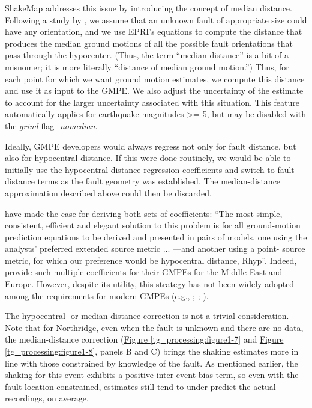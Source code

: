 \documentclass[letterpaper,10pt,english]{sphinxmanual}
\begin{document}
ShakeMap addresses this issue by introducing the concept of median distance. Following
a study by {\hyperref[references:epri2003]{}}, we assume that an unknown fault of appropriate size could have
any orientation, and we use EPRI's equations to compute the distance that produces
the median ground motions of
all the possible fault orientations that pass through the hypocenter. (Thus, the term
``median distance'' is a bit of a misnomer; it is more literally ``distance of median ground
motion.'') Thus, for each point for which we want ground motion estimates, we compute
this distance and use it as input to the GMPE. We also adjust the uncertainty of the
estimate to account for the larger uncertainty associated with this situation. This feature
automatically applies for earthquake magnitudes \textgreater{}= 5, but may be disabled with the \emph{grind} flag
\emph{-nomedian}.

Ideally, GMPE developers would always regress not only for fault distance, but also for
hypocentral distance. If this were done routinely, we would be able to initially use
the hypocentral-distance regression coefficients and switch to fault-distance terms as the
fault geometry was established. The median-distance approximation described above
could then be discarded.

{\hyperref[references:bommer2012]{}} have made the case for deriving both sets of coefficients:
``The most simple, consistent, efficient and elegant solution to this problem is for all
ground-motion prediction equations to be derived and presented in pairs of models, one
using the analysts' preferred extended source metric ... ---and another using a point-
source metric, for which our preference would be hypocentral distance,
Rhyp''. Indeed, {\hyperref[references:akkar2014]{}} provide such multiple coefficients
for their GMPEs for the Middle East and Europe. However, despite its utility, this
strategy has not been widely adopted among the requirements for modern GMPEs (e.g.,
{\hyperref[references:powers2008]{}}; {\hyperref[references:abrahamson2008]{}};
{\hyperref[references:abrahamson2014]{}}).

The hypocentral- or median-distance correction is not a trivial consideration. Note that for
Northridge, even when the fault is unknown and there are no data, the median-distance
correction (\hyperref[tg_processing:figure1-7]{Figure  \ref*{tg_processing:figure1-7}} and \hyperref[tg_processing:figure1-8]{Figure  \ref*{tg_processing:figure1-8}}, panels B and C)
brings the shaking estimates more in line
with those constrained by knowledge of the fault. As mentioned earlier, the shaking for
this event exhibits a positive inter-event bias term, so even with the fault location
constrained, estimates still tend to under-predict the actual recordings, on average.
\end{document}

